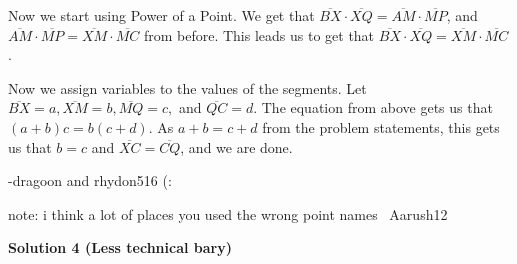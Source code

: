 \begin{enumerate}
 Now we start using Power of a Point. We get that $\overline{BX} \cdot \overline {XQ}= \overline{AM} \cdot \overline{MP}$, and $\overline{AM} \cdot \overline{MP}=\overline{XM} \cdot \overline{MC}$ from before. This leads us to get that $\overline{BX} \cdot \overline {XQ}=\overline{XM} \cdot \overline{MC}$. 

 Now we assign variables to the values of the segments. Let $\overline{BX}=a, \overline{XM}=b, \overline{MQ}=c,$ and $\overline{QC}=d$. The equation from above gets us that $(a+b)c=b(c+d)$. As $a+b=c+d$ from the problem statements, this gets us that $b=c$ and $\overline{XC}=\overline{CQ}$, and we are done.

 -dragoon and rhydon516 (:

 note: i think a lot of places you used the wrong point names ~Aarush12

 


 



\textbf{Solution 4 (Less technical bary)}


\end{enumerate}
